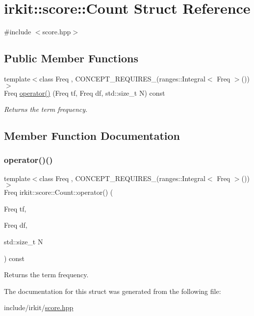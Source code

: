 \hypertarget{structirkit_1_1score_1_1Count}{}\section{irkit\+:\+:score\+:\+:Count Struct Reference}
\label{structirkit_1_1score_1_1Count}


{\ttfamily \#include $<$score.\+hpp$>$}

\subsection*{Public Member Functions}
\begin{DoxyCompactItemize}
\item 
{\footnotesize template$<$class Freq , C\+O\+N\+C\+E\+P\+T\+\_\+\+R\+E\+Q\+U\+I\+R\+E\+S\+\_\+(ranges\+::\+Integral$<$ Freq $>$()) $>$ }\\Freq \hyperlink{structirkit_1_1score_1_1Count_a0fa3a6e1c9061f90f44737b3d9debe1e}{operator()} (Freq tf, Freq df, std\+::size\+\_\+t N) const
\begin{DoxyCompactList}\small\item\em Returns the term frequency. \end{DoxyCompactList}\end{DoxyCompactItemize}


\subsection{Member Function Documentation}
\mbox{\label{structirkit_1_1score_1_1Count_a0fa3a6e1c9061f90f44737b3d9debe1e}} 
\subsubsection{\texorpdfstring{operator()()}{operator()()}}
{\footnotesize\ttfamily template$<$class Freq , C\+O\+N\+C\+E\+P\+T\+\_\+\+R\+E\+Q\+U\+I\+R\+E\+S\+\_\+(ranges\+::\+Integral$<$ Freq $>$()) $>$ \\
Freq irkit\+::score\+::\+Count\+::operator() (\begin{DoxyParamCaption}\item[{Freq}]{tf,  }\item[{Freq}]{df,  }\item[{std\+::size\+\_\+t}]{N }\end{DoxyParamCaption}) const\hspace{0.3cm}{\ttfamily [inline]}}



Returns the term frequency. 



The documentation for this struct was generated from the following file\+:\begin{DoxyCompactItemize}
\item 
include/irkit/\hyperlink{score_8hpp}{score.\+hpp}\end{DoxyCompactItemize}
